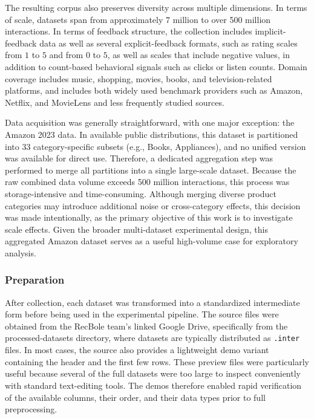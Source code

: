 \documentclass[12pt,a4paper]{article}
\begin{document}
The resulting corpus also preserves diversity across multiple dimensions. In terms of scale, datasets span from approximately 7 million to over 500 million interactions. In terms of feedback structure, the collection includes implicit-feedback data as well as several explicit-feedback formats, such as rating scales from $1$ to $5$ and from $0$ to $5$, as well as scales that include negative values, in addition to count-based behavioral signals such as clicks or listen counts. Domain coverage includes music, shopping, movies, books, and television-related platforms, and includes both widely used benchmark providers such as Amazon, Netflix, and MovieLens and less frequently studied sources.

Data acquisition was generally straightforward, with one major exception: the Amazon 2023 data. In available public distributions, this dataset is partitioned into 33 category-specific subsets (e.g., Books, Appliances), and no unified version was available for direct use. Therefore, a dedicated aggregation step was performed to merge all partitions into a single large-scale dataset. Because the raw combined data volume exceeds 500 million interactions, this process was storage-intensive and time-consuming. Although merging diverse product categories may introduce additional noise or cross-category effects, this decision was made intentionally, as the primary objective of this work is to investigate scale effects. Given the broader multi-dataset experimental design, this aggregated Amazon dataset serves as a useful high-volume case for exploratory analysis.

\subsubsection{Preparation}
After collection, each dataset was transformed into a standardized intermediate form before being used in the experimental pipeline. The source files were obtained from the RecBole team's linked Google Drive, specifically from the processed-datasets directory, where datasets are typically distributed as \texttt{.inter} files. In most cases, the source also provides a lightweight demo variant containing the header and the first few rows. These preview files were particularly useful because several of the full datasets were too large to inspect conveniently with standard text-editing tools. The demos therefore enabled rapid verification of the available columns, their order, and their data types prior to full preprocessing.
\end{document}
